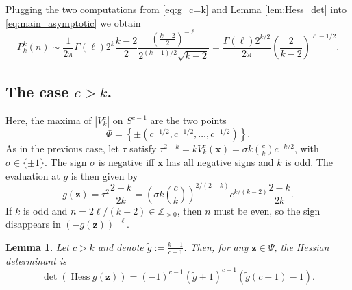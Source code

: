 \documentclass[a4paper,oneside]{amsart}
\newcommand{\bb}[1]{\boldsymbol{#1}}
\numberwithin{theorem}{section}
\newtheorem{lemma}[theorem]{Lemma}
\theoremstyle{remark}
\newcommand{\Z}{\mathbb{Z}}
\newcommand{\cE}{{P}}
\DeclareMathOperator{\Hess}{Hess}
\begin{document}
Plugging the two computations from \eqref{eq:g_c=k} and Lemma \ref{lem:Hess_det} into \eqref{eq:main_asymptotic} we obtain 
\begin{equation}
  \label{eq:num_k_chromatic}
  \cE^{k}_k(n) \sim \frac{1}{2\pi} \Gamma(\ell) 2^k \frac{k-2}{2} \frac{\left( \frac{k-2}{2} \right)^{-\ell}}{2^{(k-1)/2} \sqrt{k-2}} = \frac{\Gamma(\ell)2^{k/2}}{2\pi} \left( \frac{2}{k-2} \right)^{\ell-1/2}.
\end{equation}

\subsection*{The case $c > k$.} 

Here, the maxima of $|V^c_k|$ on $S^{c-1}$ are the two points 
\[\Phi = \left\{\pm (c^{-1/2}, c^{-1/2},\dots, c^{-1/2})\right\}.\] 
As in the previous case, let $\tau$ satisfy $\tau^{2-k} = k V^c_k(\bb{x}) = \sigma k \binom{c}{k} c^{-k/2}$, with $\sigma\in\{\pm 1\}$. The sign $\sigma$ is negative iff $\bb{x}$ has all negative signs and $k$ is odd. The evaluation at $g$ is then given by
\begin{equation}
  \label{eq:g_evaluation}
  g(\bb{z}) = \tau^2 \frac{2-k}{2k} = \left(\sigma k \binom{c}{k}\right)^{2/(2-k)} c^{k/(k-2)} \frac{2-k}{2k}.
\end{equation}
If $k$ is odd and $n = 2\ell/(k-2) \in \Z_{>0}$, then $n$ must be even, so the sign disappears in $(-g(\bb{z}))^{-\ell}$. \par

\begin{lemma}
  \label{lem:Hess_det2}
  Let $c>k$ and denote $\tilde{g} := \frac{k-1}{c-1}$. Then,
  for any $\bb{z}\in\Psi$, the Hessian determinant is 
  \[\det \left( \Hess g(\bb{z}) \right) = (-1)^{c-1}(\tilde{g} +1)^{c-1} (\tilde{g}(c-1) -1).\]
\end{lemma}
\end{document}
